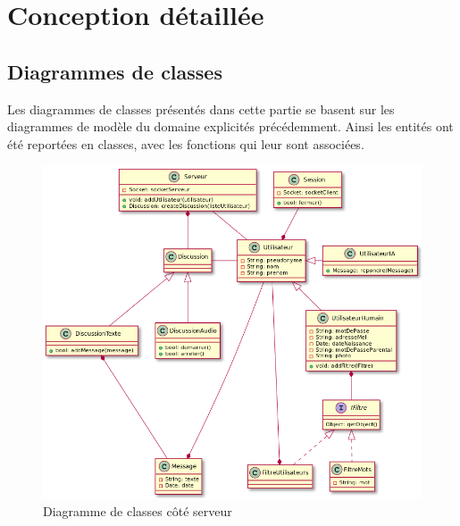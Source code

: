 \section{Conception détaillée}

	\subsection{Diagrammes de classes}
	Les diagrammes de classes présentés dans cette partie se basent sur les diagrammes de modèle du domaine explicités précédemment.
	Ainsi les entités ont été reportées en classes, avec les fonctions qui leur sont associées.
	\begin{figure}[H]
		\centerline{\includegraphics[width=16.5cm]{img/classesServeur.png}}
		\caption{Diagramme de classes côté serveur}
	\end{figure}

	\newpage

